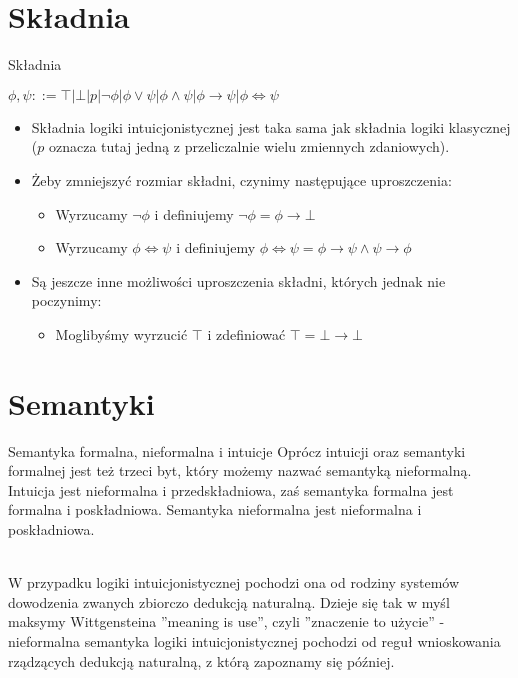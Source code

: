 \documentclass{beamer}
\renewcommand{\implies}{\rightarrow}
\begin{document}
\section{Składnia}

\begin{frame}{Składnia}

{\centering
$\phi, \psi ::= \top | \bot | p | \neg \phi | \phi \lor \psi | \phi \land \psi | \phi \implies \psi | \phi \iff \psi$ \\
}
\relax

\begin{itemize}
	\item Składnia logiki intuicjonistycznej jest taka sama jak składnia logiki klasycznej ($p$ oznacza tutaj jedną z przeliczalnie wielu zmiennych zdaniowych).
	
	\item Żeby zmniejszyć rozmiar składni, czynimy następujące uproszczenia:
	\begin{itemize}
		\item Wyrzucamy $\neg \phi$ i definiujemy $\neg \phi = \phi \implies \bot$
		\item Wyrzucamy $\phi \iff \psi$ i definiujemy $\phi \iff \psi = \phi \implies \psi \land \psi \implies \phi$
	\end{itemize}
	\item Są jeszcze inne możliwości uproszczenia składni, których jednak nie poczynimy:
	\begin{itemize}
		\item Moglibyśmy wyrzucić $\top$ i zdefiniować $\top = \bot \implies \bot$
	\end{itemize}
\end{itemize}

\end{frame}

\section{Semantyki}

\begin{frame}{Semantyka formalna, nieformalna i intuicje}
Oprócz intuicji oraz semantyki formalnej jest też trzeci byt, który możemy nazwać semantyką nieformalną. Intuicja jest nieformalna i przedskładniowa, zaś semantyka formalna jest formalna i poskładniowa. Semantyka nieformalna jest nieformalna i poskładniowa. \\~\

W przypadku logiki intuicjonistycznej pochodzi ona od rodziny systemów dowodzenia zwanych zbiorczo dedukcją naturalną. Dzieje się tak w myśl maksymy Wittgensteina ''meaning is use'', czyli ''znaczenie to użycie'' - nieformalna semantyka logiki intuicjonistycznej pochodzi od reguł wnioskowania rządzących dedukcją naturalną, z którą zapoznamy się później. \\~\
\end{frame}
\end{document}
